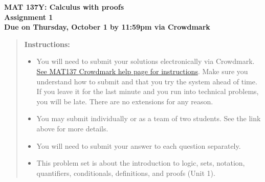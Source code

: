 \documentclass[12pt]{exam}
\newcommand{\vv}{\vspace{.2cm}}
\begin{document}
{\large
	\begin{center}
		{\bf MAT 137Y: Calculus with proofs}\\
		{\bf Assignment 1} \\
		{\bf Due on Thursday, October 1 by 11:59pm via Crowdmark}
	\end{center}
}

\vv

\begin{quotation}
{\bf Instructions:}
	\begin{itemize}
		\item	 You will need to submit your solutions electronically via Crowdmark.   \href{https://www.math.toronto.edu/~alfonso/137/PS/137_CM.html}{See MAT137 Crowdmark help page for instructions}.  Make sure you understand how to submit and that you try the system ahead of time.  If you leave it for the last minute and you run into technical problems, you will be late.  There are no extensions for any reason.
		\item You may submit individually or as a team of two students.  See the link above for more details.
		\item  You will need to submit your answer to each question separately.
		\item  This problem set is about the introduction to logic, sets, notation, quantifiers, conditionals, definitions, and proofs (Unit 1).
	\end{itemize}
\end{quotation}
\vv
\newpage
\end{document}
